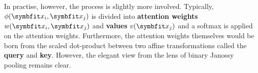In practise, however, the process is slightly more involved. Typically, $\phi(\bfitx_i, \bfitx_j)$ is divided into \textbf{attention weights} $w(\bfitx_i, \bfitx_j)$ and \textbf{values} $v(\bfitx_j)$ and a softmax is applied on the attention weights. Furthermore, the attention weights themselves would be born from the scaled dot-product between two affine transformations called the \textbf{query} and \textbf{key}.
However, the elegant view from the lens of binary Janossy pooling remains clear.